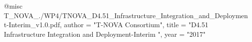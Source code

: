 @misc{ T_NOVA_./WP4/TNOVA_D4.51_Infrastructure_Integration_and_Deployment-Interim_v1.0.pdf,
       author = "{T-NOVA Consortium}",
       title = "D4.51 Infrastructure Integration and Deployment-Interim ",
       year = "2017" }
